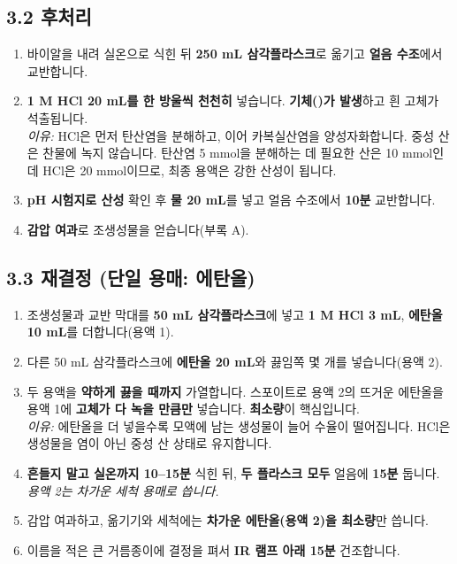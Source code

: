 \documentclass[10pt,a4paper]{article}
\begin{document}
\subsection*{3.2 후처리}
\begin{enumerate}[leftmargin=7mm,itemsep=1.2mm,label=\cbox\ \arabic*.,resume]
\item 바이알을 내려 실온으로 식힌 뒤 \textbf{250 mL 삼각플라스크}로 옮기고 \textbf{얼음 수조}에서 교반합니다.
\item \textbf{1 M HCl 20 mL를 한 방울씩 천천히} 넣습니다. \textbf{기체()가 발생}하고 흰 고체가 석출됩니다.\\
{\footnotesize \emph{이유:} HCl은 먼저 탄산염을 분해하고, 이어 카복실산염을 양성자화합니다. 중성 산은 찬물에 녹지 않습니다. 탄산염 5 mmol을 분해하는 데 필요한 산은 10 mmol인데 HCl은 20 mmol이므로, 최종 용액은 강한 산성이 됩니다.}
\item \textbf{pH 시험지로 산성} 확인 후 \textbf{물 20 mL}를 넣고 얼음 수조에서 \textbf{10분} 교반합니다.
\item \textbf{감압 여과}로 조생성물을 얻습니다(부록 A).
\end{enumerate}

\subsection*{3.3 재결정 (단일 용매: 에탄올)}
\begin{enumerate}[leftmargin=7mm,itemsep=1.2mm,label=\cbox\ \arabic*.,resume]
\item 조생성물과 교반 막대를 \textbf{50 mL 삼각플라스크}에 넣고 \textbf{1 M HCl 3 mL}, \textbf{에탄올 10 mL}를 더합니다(용액 1).
\item 다른 50 mL 삼각플라스크에 \textbf{에탄올 20 mL}와 끓임쪽 몇 개를 넣습니다(용액 2).
\item 두 용액을 \textbf{약하게 끓을 때까지} 가열합니다. 스포이트로 용액 2의 뜨거운 에탄올을 용액 1에 \textbf{고체가 다 녹을 만큼만} 넣습니다. \textbf{최소량}이 핵심입니다.\\
{\footnotesize \emph{이유:} 에탄올을 더 넣을수록 모액에 남는 생성물이 늘어 수율이 떨어집니다. HCl은 생성물을 염이 아닌 중성 산 상태로 유지합니다.}
\item \textbf{흔들지 말고 실온까지 10--15분} 식힌 뒤, \textbf{두 플라스크 모두} 얼음에 \textbf{15분} 둡니다. \emph{용액 2는 차가운 세척 용매로 씁니다.}
\item 감압 여과하고, 옮기기와 세척에는 \textbf{차가운 에탄올(용액 2)을 최소량}만 씁니다.
\item 이름을 적은 큰 거름종이에 결정을 펴서 \textbf{IR 램프 아래 15분} 건조합니다.
\end{enumerate}
\end{document}
